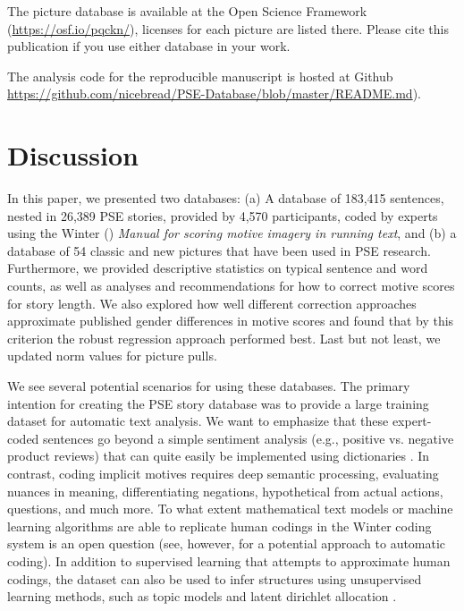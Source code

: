 \documentclass[man,a4paper,mask]{apa6}\usepackage[]{graphicx}\usepackage[]{color}
\begin{document}
The picture database is available at the Open Science Framework (\url{https://osf.io/pqckn/}), licenses for each picture are listed there. Please cite this publication if you use either database in your work.

The analysis code for the reproducible manuscript is hosted at Github \url{https://github.com/nicebread/PSE-Database/blob/master/README.md}). 


\section{Discussion}

In this paper, we presented two databases: (a) A database of 183,415 sentences, nested in 26,389 PSE stories, provided by 4,570 participants, coded by experts using the Winter (\citeyear{winter_ManualScoringMotive_1994}) \emph{Manual for scoring motive imagery in running text}, and (b) a database of 54 classic and new pictures that have been used in PSE research. Furthermore, we provided descriptive statistics on typical sentence and word counts, as well as analyses and recommendations for how to correct motive scores for story length. 
We also explored how well different correction approaches approximate published gender differences in motive scores and found that by this criterion the robust regression approach performed best.
Last but not least, we updated norm values for picture pulls.

We see several potential scenarios for using these databases. The primary intention for creating the PSE story database was to provide a large training dataset for automatic text analysis. We want to emphasize that these expert-coded sentences go beyond a simple sentiment analysis (e.g., positive vs. negative product reviews) that can quite easily be implemented using dictionaries \parencite[e.g.,][]{feldman_TechniquesApplicationsSentiment_2013}. In contrast, coding implicit motives requires deep semantic processing, evaluating nuances in meaning, differentiating negations, hypothetical from actual actions, questions, and much more. To what extent mathematical text models or machine learning algorithms are able to replicate human codings in the Winter coding system is an open question (see, however,  for a potential approach to automatic coding). In addition to supervised learning that attempts to approximate human codings, the dataset can also be used to infer structures using unsupervised learning methods, such as topic models and latent dirichlet allocation \parencite{blei_LatentDirichletAllocation_2003}.
\end{document}
